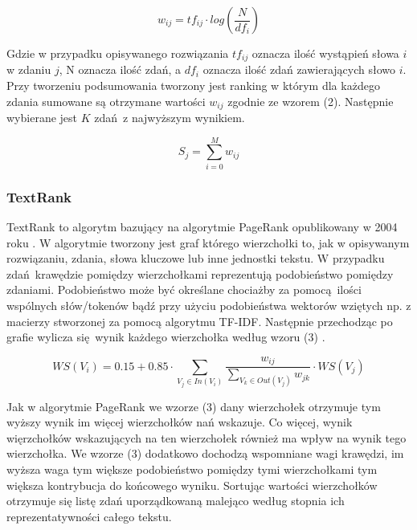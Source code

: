 \documentclass{article}
\begin{document}
\begin{center}
	\begin{equation}
		w_{ij} = tf_{ij} \cdot log(\frac{N}{df_i})
	\end{equation}
\end{center}

Gdzie w przypadku opisywanego rozwiązania $tf_{ij}$ oznacza ilość wystąpień słowa
$i$ w zdaniu $j$, N oznacza ilość zdań, a $df_i$ oznacza ilość zdań zawierających
słowo $i$. 
Przy tworzeniu podsumowania tworzony jest ranking w którym dla każdego zdania sumowane
są otrzymane wartości $w_{ij}$ zgodnie ze wzorem (2). Następnie wybierane jest $K$ 
zdań z najwyższym wynikiem.

\begin{center}
	\begin{equation}
		S_{j} = \sum_{i = 0}^{M} w_{ij}
	\end{equation}
\end{center}

\subsubsection{TextRank}
TextRank to algorytm bazujący na algorytmie PageRank opublikowany w 2004 roku \cite{mihalcea2004textrank}.
W algorytmie tworzony jest graf którego wierzchołki to, jak w opisywanym rozwiązaniu, zdania, słowa
kluczowe lub inne jednostki tekstu. W przypadku zdań krawędzie pomiędzy wierzchołkami reprezentują 
podobieństwo pomiędzy zdaniami. Podobieństwo może być określane chociażby za pomocą ilości wspólnych
słów/tokenów bądź przy użyciu podobieństwa wektorów wziętych np. z macierzy stworzonej za pomocą
algorytmu TF-IDF. Następnie przechodząc po grafie wylicza się wynik każdego wierzchołka według wzoru (3) \cite{mihalcea2004textrank}.

\begin{center}
	\begin{equation}
		WS(V_i) = 0.15 + 0.85 \cdot \sum_{V_j\in In(V_i)}^{} \frac{w_{ij}}{\sum_{V_k\in Out(V_j)}^{} w_{jk}} \cdot WS(V_j)
	\end{equation}
\end{center}

Jak w algorytmie PageRank we wzorze (3) dany wierzchołek otrzymuje tym wyższy wynik im więcej
wierzchołków nań wskazuje. Co więcej, wynik więrzchołków wskazujących na ten wierzchołek również
ma wpływ na wynik tego wierzchołka. We wzorze (3) dodatkowo dochodzą wspomniane wagi krawędzi, 
im wyższa waga tym większe podobieństwo pomiędzy tymi wierzchołkami tym większa kontrybucja 
do końcowego wyniku. Sortując wartości wierzchołków otrzymuje się listę zdań uporządkowaną malejąco
według stopnia ich reprezentatywności całego tekstu.
\end{document}
